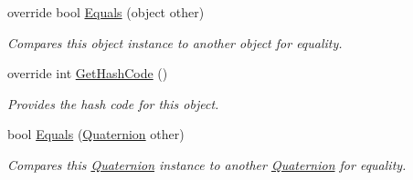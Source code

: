 \begin{DoxyCompactItemize}
override bool \hyperlink{struct_open_t_k_1_1_quaternion_ae4258668435340a6b71613bf6e086690}{Equals} (object other)
\begin{DoxyCompactList}\small\item\em Compares this object instance to another object for equality. \end{DoxyCompactList}\item 
override int \hyperlink{struct_open_t_k_1_1_quaternion_a7cf9a59b36cc514ac8f4ac71ad175c4f}{Get\-Hash\-Code} ()
\begin{DoxyCompactList}\small\item\em Provides the hash code for this object. \end{DoxyCompactList}\item 
bool \hyperlink{struct_open_t_k_1_1_quaternion_a2537c5ba956b79ba91cade02b6f6ca71}{Equals} (\hyperlink{struct_open_t_k_1_1_quaternion}{Quaternion} other)
\begin{DoxyCompactList}\small\item\em Compares this \hyperlink{struct_open_t_k_1_1_quaternion}{Quaternion} instance to another \hyperlink{struct_open_t_k_1_1_quaternion}{Quaternion} for equality. \end{DoxyCompactList}\end{DoxyCompactItemize}
